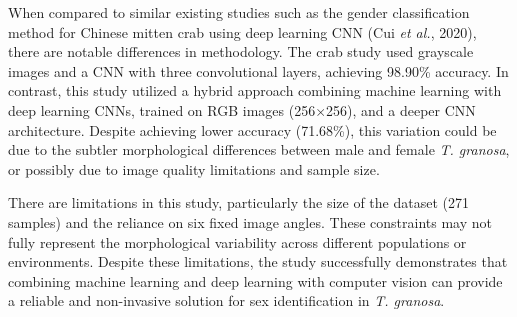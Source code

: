 When compared to similar existing studies such as the gender classification method for Chinese mitten crab using deep learning CNN (Cui \textit{et al.}, 2020), there are notable differences in methodology. The crab study used grayscale images and a CNN with three convolutional layers, achieving 98.90\% accuracy. In contrast, this study utilized a hybrid approach combining machine learning with deep learning CNNs, trained on RGB images (256$\times$256), and a deeper CNN architecture. Despite achieving lower accuracy (71.68\%), this variation could be due to the subtler morphological differences between male and female \textit{T. granosa}, or possibly due to image quality limitations and sample size.

There are limitations in this study, particularly the size of the dataset (271 samples) and the reliance on six fixed image angles. These constraints may not fully represent the morphological variability across different populations or environments. Despite these limitations, the study successfully demonstrates that combining machine learning and deep learning with computer vision can provide a reliable and non-invasive solution for sex identification in \textit{T. granosa}.